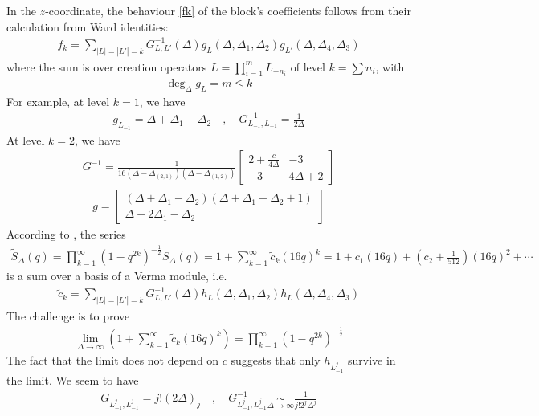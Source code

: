 \documentclass[12pt,a4paper]{article}
\begin{document}
In the $z$-coordinate, the behaviour \eqref{fk} of the block's coefficients follows from their calculation from Ward identities:
\begin{align}
 f_k = \sum_{|L|=|L'|=k} G^{-1}_{L,L'}(\Delta) g_L(\Delta,\Delta_1,\Delta_2)g_{L'}(\Delta,\Delta_4,\Delta_3)
\label{fke}
 \end{align}
where the sum is over creation operators $L=\prod_{i=1}^m L_{-n_i}$ of level $k=\sum n_i$, with 
\begin{align}
 \deg_\Delta g_L = m\leq k
\end{align}
For example, at level $k=1$, we have 
\begin{align}
 g_{L_{-1}} = \Delta + \Delta_1-\Delta_2 \quad , \quad G^{-1}_{L_{-1},L_{-1}} = \frac{1}{2\Delta} 
\end{align}
At level $k=2$, we have 
\begin{align}
G^{-1} = \frac{1}{16(\Delta-\Delta_{(2,1)})(\Delta-\Delta_{(1,2)})} \begin{bmatrix} 2+\frac{c}{4\Delta} & -3 \\ -3 & 4\Delta+2 \end{bmatrix}
\end{align}
\begin{align}
 g = \begin{bmatrix} (\Delta+\Delta_1-\Delta_2)(\Delta+\Delta_1-\Delta_2+1) \\ \Delta+2\Delta_1-\Delta_2 \end{bmatrix}
\end{align}
According to \cite[Eq. (7.11)]{msz15}, the series 
\begin{align}
 \widetilde{S}_\Delta(q) =  \prod_{k=1}^\infty\left(1-q^{2k}\right)^{-\frac12} S_\Delta(q)  = 1+\sum_{k=1}^\infty \tilde{c}_k (16q)^k = 1 + c_1 (16q) + \left(c_2+\tfrac{1}{512}\right) (16q)^2 + \cdots 
\end{align}
is a sum over a basis of a Verma module, i.e. 
\begin{align}
 \tilde{c}_k = \sum_{|L|=|L'|=k} G^{-1}_{L,L'}(\Delta) h_L(\Delta,\Delta_1,\Delta_2)h_L(\Delta,\Delta_4,\Delta_3)
 \label{ghh}
\end{align}
The challenge is to prove 
\begin{align}
 \lim_{\Delta\to \infty} \left(1+\sum_{k=1}^\infty \tilde{c}_k (16q)^k\right) = \prod_{k=1}^\infty\left(1-q^{2k}\right)^{-\frac12}
\end{align}
The fact that the limit does not depend on $c$ suggests that only $h_{L_{-1}^j}$ survive in the limit. We seem to have 
\begin{align}
 G_{L_{-1}^j,L_{-1}^j} = j! (2\Delta)_j \quad , \quad 
 G^{-1}_{L_{-1}^j,L_{-1}^j} \underset{\Delta\to \infty}{\sim} \frac{1}{j!2^j\Delta^j}
\end{align}
\end{document}
